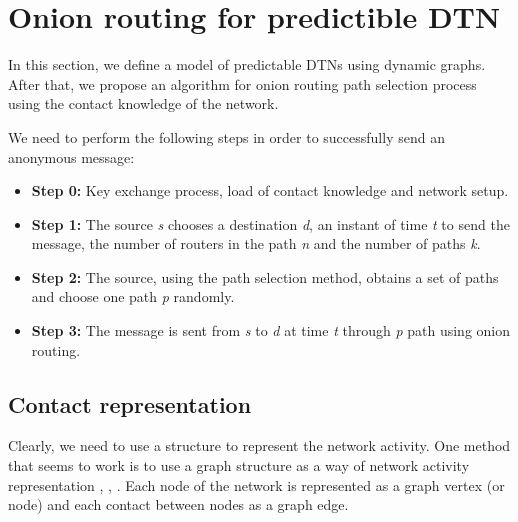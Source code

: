 \section{Onion routing for predictible DTN}\label{sec:proposal}



In this section, we define a model of predictable DTNs using dynamic graphs. After that, we propose an algorithm for onion routing path selection process using the contact knowledge of the network.

We need to perform the following steps in order to successfully send an anonymous message:

\begin{itemize}
\item	\textbf{Step 0:} Key exchange process, load of contact knowledge and network setup.
\item \textbf{Step 1:} The source \textit{s} chooses a destination \textit{d}, an instant of time \textit{t} to send the message, the number of routers in the path \textit{n} and the number of paths \textit{k}.
\item \textbf{Step 2: } The source, using the path selection method, obtains a set of paths and choose one path \textit{p} randomly.
\item \textbf{Step 3: } The message is sent from \textit{s} to \textit{d} at time \textit{t} through \textit{p} path using onion routing.
\end{itemize}

\subsection{Contact representation}


Clearly, we need to use a structure to represent the network activity. One method that seems to work is to use a graph structure as a way of network activity representation \cite{probabilistic-dtn}, \cite{deterministic-dtn}, \cite{contact-graph}. Each node of the network is represented as a graph vertex (or node) and each contact between nodes as a graph edge. 

